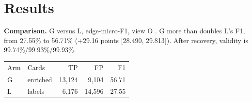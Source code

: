 \section{Results}
\textbf{Comparison.} G versus L, edge-micro-F1, view O \cite{r4}.
G more than doubles L's F1, from 27.55\% to 56.71\% (+29.16 points {[}28.490, 29.813{]}).
After recovery, validity is 99.74\%/99.93\%/99.93\%.
\begin{tabular}{llrrr}
Arm & Cards & TP & FP & F1 \\
G & enriched & 13,124 & 9,104 & 56.71 \\
L & labels & 6,176 & 14,596 & 27.55 \\
\end{tabular}
